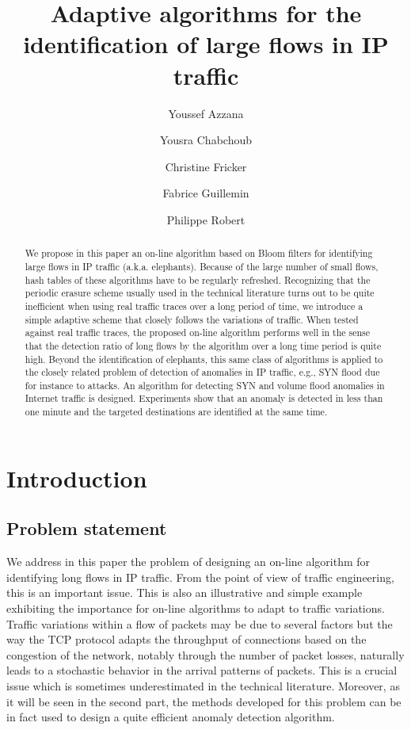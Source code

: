 \documentclass{amsart}
\title[Adaptive algorithms for IP Traffic]{Adaptive algorithms for the identification of large flows in IP traffic}
\author{Youssef Azzana}\thanks{Work done during PhD preparation at INRIA Paris -- Rocquencourt}
\author[Chabchoub]{Yousra Chabchoub}
\author[Fricker]{Christine Fricker}
\author[Guillemin]{Fabrice Guillemin}
\author[Robert]{Philippe  Robert}
\begin{document}
\maketitle
\begin{abstract}
We propose in this paper an on-line algorithm based on Bloom filters for identifying large
flows in IP traffic  (a.k.a. elephants). Because of the large number  of small flows, hash
tables of these algorithms have to  be regularly refreshed.  Recognizing that the periodic
erasure scheme usually used in the  technical literature turns out to be quite inefficient
when using real traffic traces over a  long period of time, we introduce a simple adaptive
scheme that closely  follows the variations of traffic.  When  tested against real traffic
traces, the proposed on-line algorithm performs well in the sense that the detection ratio
of  long flows  by the  algorithm  over a  long time  period  is quite  high.  Beyond  the
identification  of elephants,  this same  class of  algorithms is  applied to  the closely
related problem of detection of anomalies in  IP traffic, e.g., SYN flood due for instance
to attacks.  An algorithm for detecting SYN and volume flood anomalies in Internet traffic
is designed. Experiments show that an anomaly  is detected in less than one minute and the
targeted destinations are identified at the same time.
\end{abstract}

\section {Introduction}


\subsection*{Problem statement}
We address in this paper the  problem of designing an  on-line algorithm for  identifying  long flows in  IP
traffic.  From the point of view of
traffic engineering, this is an important issue.  This is
also an illustrative and
simple  example exhibiting  the importance  for on-line  algorithms to  adapt  to traffic
variations.  Traffic variations within a flow of packets may be due to several factors but the  way the TCP  
protocol  adapts the  throughput of  connections based  on the  congestion of  the network, notably through the number of packet losses, naturally leads to a stochastic behavior in the arrival patterns of packets. This is  a crucial issue which
is sometimes underestimated in the technical literature.  Moreover, as it will be seen in the second part, the methods developed for this problem
can be in fact used to design a quite efficient anomaly  detection algorithm.
\end{document}
